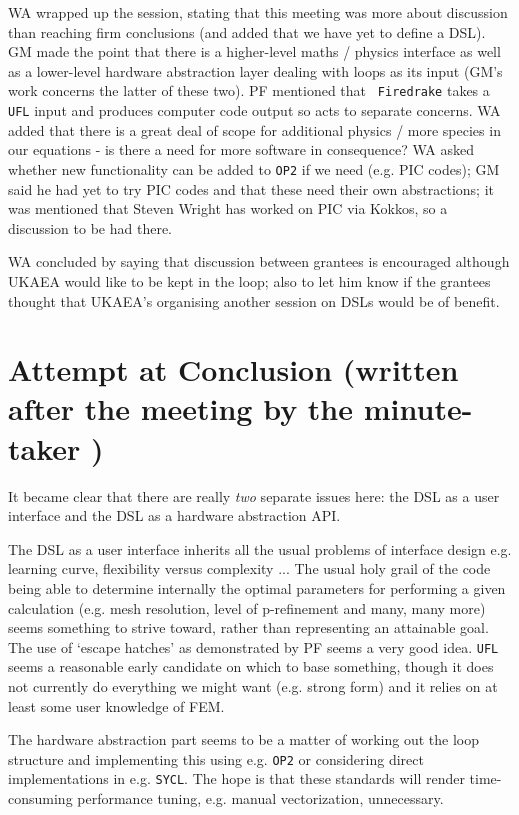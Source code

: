 \documentclass[11pt]{article}
\begin{document}
WA wrapped up the session, stating that this meeting was more about discussion 
than reaching firm conclusions (and added that we have yet to define a DSL).  
GM made the point that there is a higher-level maths / physics interface as 
well as a lower-level hardware abstraction layer dealing with loops as its 
input (GM's work concerns the latter of these two).  PF mentioned that {\tt 
Firedrake} takes a {\tt UFL} input and produces computer code output so acts to 
separate concerns.  WA added that there is a great deal of scope for additional 
physics / more species in our equations - is there a need for more software
in consequence?
WA asked whether new functionality can be added to {\tt OP2} if we need (e.g. 
PIC codes); GM said he had yet to try PIC codes and that these need their own 
abstractions; it was mentioned that Steven Wright has worked on PIC via Kokkos, 
so a discussion to be had there.

WA concluded by saying that discussion between grantees is encouraged although UKAEA 
would like to be kept in the loop; also to let him know if the grantees 
thought that UKAEA's organising another session on DSLs would be of benefit.

\section{Attempt at Conclusion (written after the meeting by the minute-taker )}

It became clear that there are really {\it two} separate issues here: the DSL 
as a user interface and the DSL as a hardware abstraction API.

The DSL as a user interface inherits all the usual problems of interface design 
e.g. learning curve, flexibility versus complexity ... The usual holy grail of 
the code being able to determine internally the optimal parameters for 
performing a given calculation (e.g. mesh resolution, level of p-refinement and 
many, many more) seems something to strive toward, rather than representing an 
attainable goal.  The use of `escape hatches' as demonstrated by PF seems a 
very good idea.  {\tt UFL} seems a reasonable early candidate on which to base 
something, though it does not currently do everything we might want (e.g. 
strong form) and it relies on at least some user knowledge of FEM.

The hardware abstraction part seems to be a matter of working out the loop 
structure and implementing this using e.g. {\tt OP2} or considering direct 
implementations in e.g. {\tt SYCL}.  The hope is that these standards will 
render time-consuming performance tuning, e.g. manual vectorization, 
unnecessary.
\end{document}
